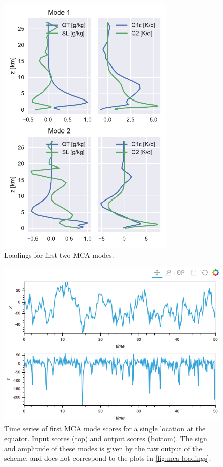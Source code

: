 \documentclass{report}
\begin{document}
\begin{figure}
  \centering
  \includegraphics[height=5in]{images/mca_modes.pdf}
  \caption{Loadings for first two MCA modes.}
  \label{fig:mca-loadings}
\end{figure}
\begin{figure}
  \centering
  \includegraphics[width=\textwidth]{images/mca_ts.png}
  \caption{Time series of first MCA mode scores for a single location at the
    equator. 
    Input scores (top) and output scores (bottom). 
    The sign and amplitude of these modes is given by the raw output of the
    scheme, and does not correspond to the plots in \autoref{fig:mca-loadings}.}
  \label{fig:mca-ts}
\end{figure}
\end{document}
